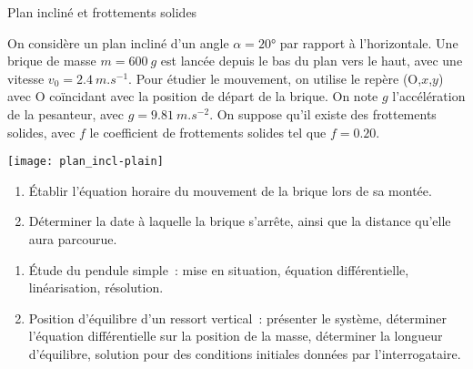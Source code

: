 \documentclass[a4paper, 12pt, final, garamond]{book}
\begin{document}
\begin{NCexem}[width=\linewidth]{Plan incliné et frottements solides}
    \begin{minipage}{0.6\linewidth}
        On considère un plan incliné d'un angle $\alpha = \ang{20;;}$ par
        rapport à l'horizontale. Une brique de masse $m = \SI{600}{g}$ est
        lancée depuis le bas du plan vers le haut, avec une vitesse $v_0 =
        \SI{2.4}{m.s^{-1}}$. Pour étudier le mouvement, on utilise le repère
        (O,$x$,$y$) avec O coïncidant avec la position de départ de la brique.
        On note $g$ l'accélération de la pesanteur, avec $g =
        \SI{9.81}{m.s^{-2}}$. On suppose qu'il existe des frottements solides,
        avec $f$ le coefficient de frottements solides tel que $f =
        \num{0.20}$.\bigbreak
    \end{minipage}
    \hfill
    \begin{minipage}{0.35\linewidth}
        \begin{center}
            \texttt{[image: plan\_incl-plain]}
        \end{center}
    \end{minipage}
    \begin{enumerate}
        \item Établir l'équation horaire du mouvement de la brique lors de
            sa montée.
        \item Déterminer la date à laquelle la brique s'arrête, ainsi que la
            distance qu'elle aura parcourue.
    \end{enumerate}
\end{NCexem}
\begin{enumerate}[label=\sqenumi, resume]
    \item Étude du pendule simple~: mise en situation, équation différentielle,
        linéarisation, résolution.
    \item Position d'équilibre d'un ressort vertical~: présenter le système,
        déterminer l'équation différentielle sur la position de la masse,
        déterminer la longueur d'équilibre, solution pour des conditions
        initiales données par l'interrogataire.
\end{enumerate}
\end{document}
